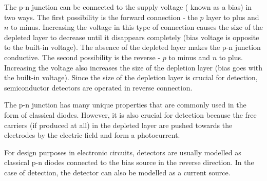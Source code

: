 \par
The p-n junction can be connected to the supply voltage ( known as a bias) in two ways. The first possibility is the forward connection - the $p$ layer to plus and $n$ to minus. Increasing the voltage in this type of connection causes the size of the depleted layer to decrease until it disappears completely (bias voltage is opposite to the built-in voltage). The absence of the depleted layer makes the p-n junction conductive. The second possibility is the reverse - $p$ to minus and $n$ to plus. Increasing the voltage also increases the size of the depletion layer (bias goes with the built-in voltage). Since the size of the depletion layer is crucial for detection, semiconductor detectors are operated in reverse connection.


\par
The p-n junction has many unique properties that are commonly used in the form of classical diodes. However, it is also crucial for detection because the free carriers (if produced at all) in the depleted layer are pushed towards the electrodes by the electric field and form a photocurrent.

\par
For design purposes in electronic circuits, detectors are usually modelled as classical p-n diodes connected to the bias source in the reverse direction. In the case of detection, the detector can also be modelled as a current source.


